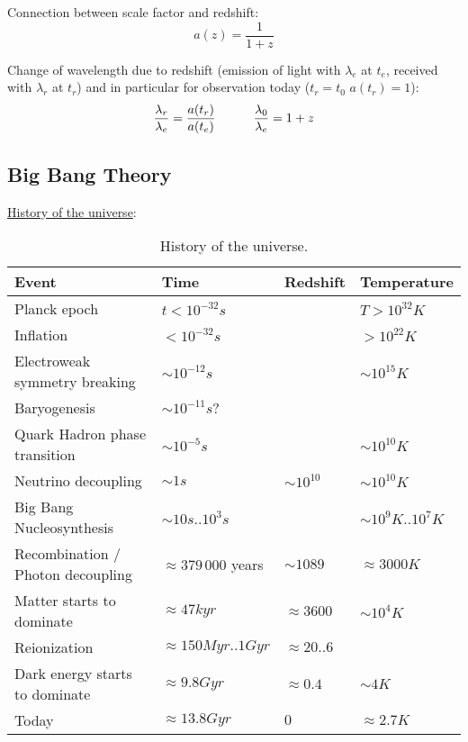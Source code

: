 		\noindent
		Connection between scale factor and redshift:
		\begin{equation}
			a(z) = \frac{1}{1+z}
		\end{equation}

		\noindent
		Change of wavelength due to redshift (emission of light with $\lambda_e$ at $t_e$, received with $\lambda_r$ at $t_r$) and in particular for observation today ($t_r=t_0$ \ie $a(t_r)=1$):
		\begin{equation}
			\frac{\lambda_r}{\lambda_e} = \frac{a(t_r)}{a(t_e)}
			\hspace{30pt}
			\frac{\lambda_0}{\lambda_e} = 1+z
		\end{equation}

	\subsection{Big Bang Theory}
		\noindent
		\href{https://en.wikipedia.org/wiki/Chronology_of_the_universe#Tabular_summary}{History of the universe}:
		\begin{table}[ht]
			\begin{center}
				\begin{tabular}{ l | l | l | l }
					Event & Time & Redshift & Temperature \\ \hline
					Planck epoch & $t < 10^{-32}\unit{s}$ & & $T>10^{32}\unit{K}$ \\
					Inflation & $< 10^{-32}\unit{s}$ & & $>10^{22}\unit{K}$ \\
					Electroweak symmetry breaking & $\sim 10^{-12}\unit{s}$ & & $\sim10^{15}\unit{K}$ \\
					Baryogenesis & $\sim 10^{-11}\unit{s}$? & & \\
					Quark Hadron phase transition & $\sim 10^{-5}\unit{s}$ & & $\sim 10^{10}\unit{K}$ \\
					Neutrino decoupling & $\sim 1\unit{s}$ & $\sim 10^{10}$ & $\sim 10^{10}\unit{K}$ \\
					Big Bang Nucleosynthesis & $\sim 10 \unit{s}..10^3\unit{s}$ & & $\sim 10^9\unit{K}..10^7\unit{K}$ \\
					Recombination / Photon decoupling & $\approx 379\,000$ years & $\sim 1089$ & $\approx 3000\unit{K}$ \\
					Matter starts to dominate & $\approx 47\unit{kyr}$ & $\approx 3600$ & $\sim 10^4\unit{K}$ \\
					Reionization & $\approx 150\unit{Myr}..1\unit{Gyr}$ & $\approx 20..6$ &  \\
					Dark energy starts to dominate & $\approx 9.8\unit{Gyr}$ & $\approx 0.4$ & $\sim 4\unit{K}$ \\
					Today & $\approx 13.8\unit{Gyr}$ & $0$ & $\approx 2.7\unit{K}$ \\
				\end{tabular}
				\caption{History of the universe.}
			\end{center}
		\end{table}

